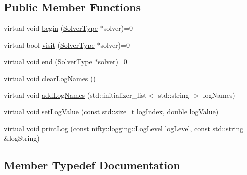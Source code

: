 \subsection*{Public Member Functions}
\begin{DoxyCompactItemize}
\item 
virtual void \hyperlink{classnifty_1_1graph_1_1optimization_1_1common_1_1VisitorBase_a9560f91b3b7667fd560cc763dabaf0d0}{begin} (\hyperlink{classnifty_1_1graph_1_1optimization_1_1common_1_1VisitorBase_a233e657d5334c972e39a44ac675f6e85}{Solver\+Type} $\ast$solver)=0
\item 
virtual bool \hyperlink{classnifty_1_1graph_1_1optimization_1_1common_1_1VisitorBase_aff1cecd18a8436d5e0991fcf32f56400}{visit} (\hyperlink{classnifty_1_1graph_1_1optimization_1_1common_1_1VisitorBase_a233e657d5334c972e39a44ac675f6e85}{Solver\+Type} $\ast$solver)=0
\item 
virtual void \hyperlink{classnifty_1_1graph_1_1optimization_1_1common_1_1VisitorBase_a484ee4ba40a202fe2c49432506276548}{end} (\hyperlink{classnifty_1_1graph_1_1optimization_1_1common_1_1VisitorBase_a233e657d5334c972e39a44ac675f6e85}{Solver\+Type} $\ast$solver)=0
\item 
virtual void \hyperlink{classnifty_1_1graph_1_1optimization_1_1common_1_1VisitorBase_a0f7bfb9cc07cc4bc1c0b6d0ef1fd8e7f}{clear\+Log\+Names} ()
\item 
virtual void \hyperlink{classnifty_1_1graph_1_1optimization_1_1common_1_1VisitorBase_a73804c5f23d41036e8d83df9ff89f313}{add\+Log\+Names} (std\+::initializer\+\_\+list$<$ std\+::string $>$ log\+Names)
\item 
virtual void \hyperlink{classnifty_1_1graph_1_1optimization_1_1common_1_1VisitorBase_a9acdf4339af149937378e289a26c546f}{set\+Log\+Value} (const std\+::size\+\_\+t log\+Index, double log\+Value)
\item 
virtual void \hyperlink{classnifty_1_1graph_1_1optimization_1_1common_1_1VisitorBase_abc345e20d2aa73df274b6f8a001bc296}{print\+Log} (const \hyperlink{namespacenifty_1_1logging_a3385625f9a0dbb17f70c47d3fca2f64d}{nifty\+::logging\+::\+Log\+Level} log\+Level, const std\+::string \&log\+String)
\end{DoxyCompactItemize}


\subsection{Member Typedef Documentation}
\hypertarget{classnifty_1_1graph_1_1optimization_1_1common_1_1VisitorBase_a233e657d5334c972e39a44ac675f6e85}{}
